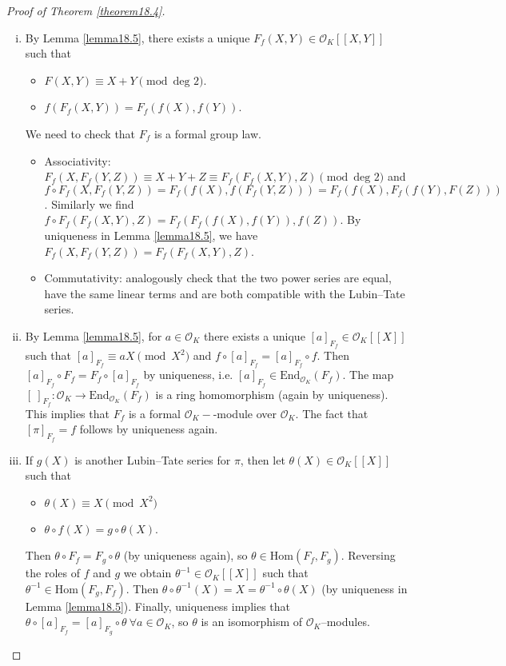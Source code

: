 \documentclass{article}
\theoremstyle{definition}
\begin{document}
\begin{proof}[Proof of Theorem \ref{theorem18.4}]
    \begin{enumerate}[(i)]
        \item By Lemma \ref{lemma18.5}, there exists a unique $F_f(X,Y) \in \mathcal{O}_K[[X,Y]]$ such that 
        \begin{itemize}
            \item $F(X,Y) \equiv X + Y \pmod{\text{deg }2}$.
            \item $f(F_f(X,Y)) = F_f(f(X),f(Y))$.
        \end{itemize}
        We need to check that $F_f$ is a formal group law. 
        \begin{itemize}
            \item Associativity: $F_f(X,F_f(Y,Z)) \equiv X + Y + Z \equiv F_f(F_f(X,Y),Z)\pmod{\text{deg }2}$ and $f \circ F_f(X,F_f(Y,Z)) = F_f(f(X),f(F_f(Y,Z))) = F_f(f(X),F_f(f(Y),F(Z)))$. Similarly we find $f \circ F_f(F_f(X,Y),Z) = F_f(F_f(f(X),f(Y)),f(Z))$. By uniqueness in Lemma \ref{lemma18.5}, we have $F_f(X,F_f(Y,Z)) = F_f(F_f(X,Y),Z)$.
            \item Commutativity: analogously check that the two power series are equal, have the same linear terms and are both compatible with the Lubin--Tate series.
        \end{itemize}
        \item By Lemma \ref{lemma18.5}, for $a \in \mathcal{O}_K$ there exists a unique $[a]_{F_f} \in \mathcal{O}_K[[X]]$ such that $[a]_{F_f} \equiv a X \pmod{X^2}$ and $f \circ [a]_{F_f} = [a]_{F_f} \circ f$. Then $[a]_{F_f} \circ F_f = F_f \circ [a]_{F_f}$ by uniqueness, i.e. $[a]_{F_f} \in \text{End}_{\mathcal{O}_K}(F_f)$. The map $[~]_{F_f} : \mathcal{O}_K \to \text{End}_{\mathcal{O}_K}(F_f)$ is a ring homomorphism (again by uniqueness). This implies that $F_f$ is a formal $\mathcal{O}_K-$-module over $\mathcal{O}_K$. The fact that $[\pi]_{F_f} = f$ follows by uniqueness again.
        \item If $g(X)$ is another Lubin--Tate series for $\pi$, then let $\theta(X) \in \mathcal{O}_K[[X]]$ such that
        \begin{itemize}
            \item $\theta(X) \equiv X \pmod{X^2}$
            \item $\theta \circ f(X) = g \circ \theta(X)$.
        \end{itemize}
        Then $\theta \circ F_f = F_g \circ \theta$ (by uniqueness again), so $\theta \in \text{Hom}(F_f,F_g)$. Reversing the roles of $f$ and $g$ we obtain $\theta^{-1} \in \mathcal{O}_K[[X]]$ such that $\theta^{-1} \in \text{Hom}(F_g,F_f)$. Then $\theta \circ \theta^{-1}(X) = X = \theta^{-1} \circ \theta(X)$ (by uniqueness in Lemma \ref{lemma18.5}). Finally, uniqueness implies that $\theta \circ [a]_{F_f} = [a]_{F_g} \circ \theta ~\forall a \in \mathcal{O}_K$, so $\theta$ is an isomorphism of $\mathcal{O}_K$--modules.
    \end{enumerate}
\end{proof}
\end{document}
